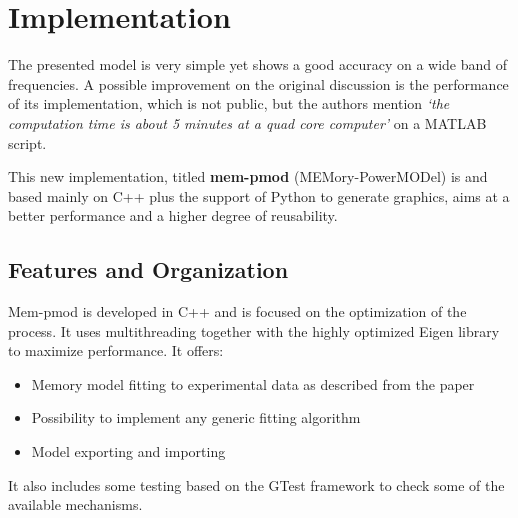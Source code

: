 \section{Implementation}
The presented model is very simple yet shows a good accuracy on a wide band of frequencies. A possible improvement on the original discussion is the performance of its implementation, which is not public, but the authors mention \textit{`the computation time is about 5 minutes at a quad core
computer'}\cite{Hao-HsiangChuang2010ABCP} on a MATLAB script\autocite{5451081}.

This new implementation, titled \textbf{mem-pmod} (MEMory-PowerMODel) is  and based mainly on C++ plus the support of Python to generate graphics, aims at a better performance and a higher degree of reusability.

\subsection{Features and Organization}
Mem-pmod is developed in C++ and is focused on the optimization of the process. It uses multithreading together with the highly optimized Eigen library to maximize performance. It offers:
\begin{itemize}
    \item Memory model fitting to experimental data as described from the paper
    \item Possibility to implement any generic fitting algorithm
    \item Model exporting and importing
\end{itemize}
It also includes some testing based on the GTest framework to check some of the available mechanisms.


